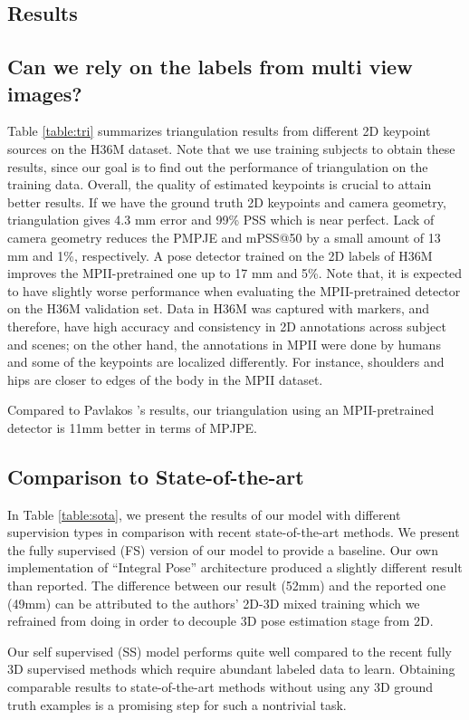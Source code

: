 \documentclass[10pt,twocolumn,letterpaper]{article}
\begin{document}
\subsection{Results}
\subsection*{Can we rely on the labels from multi view images?}
Table \ref{table:tri} summarizes triangulation results from different 2D keypoint sources on the H36M dataset. Note that we use training subjects to obtain these results, since our goal is to find out  the performance of triangulation on the training data. Overall, the quality of estimated keypoints is crucial to attain better results. If we have the ground truth 2D keypoints and camera geometry, triangulation gives 4.3 mm error and 99\% PSS which is near perfect. Lack of camera geometry reduces the PMPJE and mPSS@50 by a small amount of 13 mm and 1\%, respectively. A pose detector trained on the 2D labels of H36M improves the MPII-pretrained one up to 17 mm and 5\%. Note that, it is expected to have slightly worse performance when evaluating the MPII-pretrained detector on the H36M validation set. Data in H36M was captured with markers, and therefore, have high accuracy and consistency in 2D annotations across subject and scenes; on the other hand, the annotations in MPII were done by humans and some of the keypoints are localized differently. For instance, shoulders and hips are closer to edges of the body in the MPII dataset. 

Compared  to Pavlakos \etal’s \cite{pavlakos2017harvesting} results, our triangulation using an MPII-pretrained detector is 11mm better in terms of MPJPE.
\subsection*{Comparison to State-of-the-art}
In Table \ref{table:sota}, we present the results of our model with different supervision types in comparison with recent state-of-the-art methods. We present the fully supervised (FS) version of our model to provide a baseline. Our own implementation of  “Integral Pose” architecture \cite{Sun_2018_ECCV} produced a slightly different result than reported. The difference between our result (52mm) and the reported one \cite{Sun_2018_ECCV} (49mm) can be attributed to the authors’ 2D-3D mixed training which we refrained from doing in order to decouple 3D pose estimation stage from 2D.

Our self supervised (SS) model performs quite well compared to the recent fully 3D supervised methods \cite{pavlakos17volumetric, Rogez_2017_CVPR, sanzari, Tome_2017_CVPR} which require abundant labeled data to learn. Obtaining comparable results to state-of-the-art methods without using any 3D ground truth examples is a promising step for such a nontrivial task.
\end{document}
